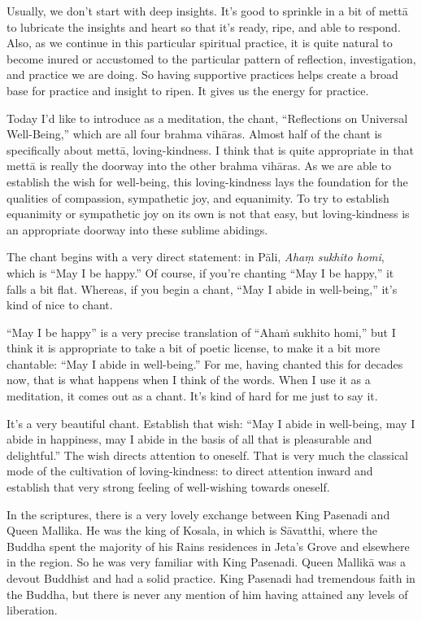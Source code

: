 Usually, we don’t start with deep insights. It’s good to sprinkle in a
bit of mettā to lubricate the insights and heart so that it’s ready,
ripe, and able to respond. Also, as we continue in this particular
spiritual practice, it is quite natural to become inured or accustomed
to the particular pattern of reflection, investigation, and practice we
are doing. So having supportive practices helps create a broad base for
practice and insight to ripen. It gives us the energy for practice.

Today I’d like to introduce as a meditation, the chant, “Reflections on
Universal Well-Being,” which are all four brahma vihāras. Almost half of
the chant is specifically about mettā, loving-kindness. I think that is
quite appropriate in that mettā is really the doorway into the other
brahma vihāras. As we are able to establish the wish for well-being,
this loving-kindness lays the foundation for the qualities of
compassion, sympathetic joy, and equanimity. To try to establish
equanimity or sympathetic joy on its own is not that easy, but
loving-kindness is an appropriate doorway into these sublime abidings.

The chant begins with a very direct statement: in Pāli, \emph{Ahaṃ
sukhito homi}, which is “May I be happy.” Of course, if you’re chanting
“May I be happy,” it falls a bit flat. Whereas, if you begin a chant,
“May I abide in well-being,” it’s kind of nice to chant.

“May I be happy” is a very precise translation of “Ahaṁ sukhito homi,”
but I think it is appropriate to take a bit of poetic license, to make
it a bit more chantable: “May I abide in well-being.” For me, having
chanted this for decades now, that is what happens when I think of the
words. When I use it as a meditation, it comes out as a chant. It’s kind
of hard for me just to say it.

It’s a very beautiful chant. Establish that wish: “May I abide in
well-being, may I abide in happiness, may I abide in the basis of all
that is pleasurable and delightful.” The wish directs attention to
oneself. That is very much the classical mode of the cultivation of
loving-kindness: to direct attention inward and establish that very
strong feeling of well-wishing towards oneself.

In the scriptures, there is a very lovely exchange between King Pasenadi
and Queen Mallika. He was the king of Kosala, in which is Sāvatthi,
where the Buddha spent the majority of his Rains residences in Jeta's
Grove and elsewhere in the region. So he was very familiar with King
Pasenadi. Queen Mallikā was a devout Buddhist and had a solid practice.
King Pasenadi had tremendous faith in the Buddha, but there is never any
mention of him having attained any levels of liberation.

